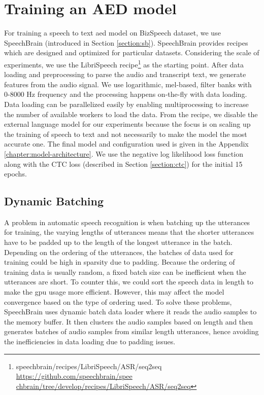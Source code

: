 \section{Training an AED model}
\label{section:attention_train}
For training a speech to text \acrshort{aed} model on BizSpeech dataset, we use SpeechBrain (introduced in Section \ref{section:sb}). SpeechBrain provides recipes which are designed and optimized for particular datasets. Considering the scale of experiments, we use the LibriSpeech recipe\footnote{speechbrain/recipes/LibriSpeech/ASR/seq2seq \href{https://github.com/speechbrain/speechbrain/tree/develop/recipes/LibriSpeech/ASR/seq2seq}{https://github.com/speechbrain/spee chbrain/tree/develop/recipes/LibriSpeech/ASR/seq2seq}} as the starting point. After data loading and preprocessing to parse the audio and transcript text, we generate features from the audio signal. We use logarithmic, mel-based, filter banks 
\cite{Vetterli1992WaveletsDesign} with  0-8000 Hz frequency and the processing happens on-the-fly with data loading. Data loading can be parallelized easily by enabling multiprocessing to increase the number of available workers to load the data. From the recipe, we disable the external language model for our experiments because the focus is on scaling up the training of speech to text and not necessarily to make the model the most accurate one. The final model and configuration used is given in the Appendix \ref{chapter:model-architecture}. We use the negative log likelihood loss function along with the CTC loss (described in Section \ref{section:ctc}) for the initial 15 epochs. 

\subsection{Dynamic Batching}
\label{section:dynbatch}
A problem in automatic speech recognition is when batching up the utterances for training, the varying lengths of utterances means that the shorter utterances have to be padded up to the length of the longest utterance in the batch. Depending on the ordering of the utterances, the batches of data used for training could be high in sparsity due to padding. Because the ordering of training data is usually random, a fixed batch size can be inefficient when the utterances are short. To counter this, we could sort the speech data in length to make the \acrshort{gpu} usage more efficient. However, this may affect the model convergence based on the type of ordering used. To solve these problems, SpeechBrain uses dynamic batch data loader where it reads the audio samples to the memory buffer. It then clusters the audio samples based on length and then generates batches of audio samples from similar length utterances, hence avoiding the inefficiencies in data loading due to padding issues. 

